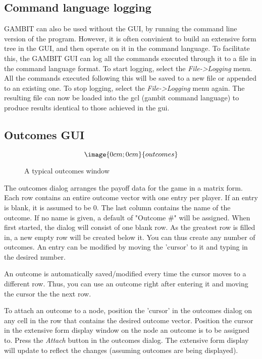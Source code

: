 \subsection{Command language logging}
GAMBIT can also be used without the GUI, by running the command line
version of the program.  However, it is often convinient to build an
extensive form tree in the GUI, and then operate on it in the command
language.  To facilitate this, the GAMBIT GUI can log all the commands
executed through it to a file in the command language format.  To start
logging, select the {\em File->Logging} menu.  All the commands executed
following this will be saved to a new file or appended to an existing one.
To stop logging, select the {\em File->Logging} menu again.  The resulting
file can now be loaded into the gcl (gambit command language) to produce
results identical to those achieved in the gui.


\subsection{Outcomes GUI}\label{OutcomesGUI}
\begin{figure}
$$\image{0cm;0cm}{outcomes}$$
\caption{A typical outcomes window}\label{fig:outcomes}
\end{figure}

The outcomes dialog arranges the payoff data for the game in a matrix
form.  Each row contains an entire outcome vector with one entry per
player.  If an entry is blank, it is assumed to be 0.  The last column
contains the name of the outcome.  If no name is given, a default of
"Outcome \#" will be assigned.  When first started, the dialog will consist
of one blank row.  As the greatest row is filled in, a new empty row will
be created below it.  You can thus create any number of outcomes.  An
entry can be modified by moving the 'cursor' to it and typing in the
desired number.

An outcome is automatically saved/modified every time the cursor moves to
a different row.  Thus, you can use an outcome right after entering it and
moving the cursor the the next row.

To attach an outcome to a node, position the 'cursor' in the outcomes
dialog on any cell in the row that contains the desired outcome vector.
Position the cursor in the extensive form display window on the node an
outcome is to be assigned to.  Press the {\em Attach} button in the
outcomes dialog.  The extensive form display will update to reflect the
changes (assuming outcomes are being displayed).


